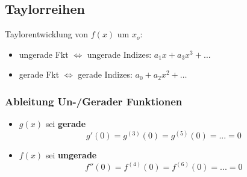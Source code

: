 \subsection{Taylorreihen}
    Taylorentwicklung von $f(x)$ um $x_o$:
    \begin{itemize}
    \item ungerade Fkt $\Leftrightarrow$ ungerade Indizes: $a_1x + a_3x^3 + \dots$
    \item gerade Fkt $\Leftrightarrow$ gerade Indizes: $a_0 + a_2x^2 + \dots$
    \end{itemize}

\subsubsection{Ableitung Un-/Gerader Funktionen}
    \begin{itemize}
        \item $g(x)$ sei \textbf{gerade}
            $$
                g'(0)=g^{(3)}(0)=g^{(5)}(0)=...=0
            $$
        \item $f(x)$ sei \textbf{ungerade}
            $$
                f''(0)=f^{(4)}(0)=f^{(6)}(0)=...=0
            $$
    \end{itemize}